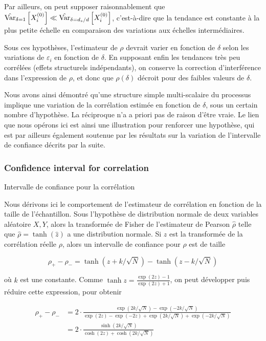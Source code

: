 Par ailleurs, on peut supposer raisonnablement que $\hat{\operatorname{Var}}_{\delta = 1}\left[X_i^{(0)}\right] \ll \hat{\operatorname{Var}}_{\delta = d_s / d}\left[X_i^{(0)}\right]$, c'est-à-dire que la tendance est constante à la plus petite échelle en comparaison des variations aux échelles intermédiaires.

Sous ces hypothèses, l'estimateur de $\rho$ devrait varier en fonction de $\delta$ selon les variations de $\varepsilon_i$ en fonction de $\delta$. En supposant enfin les tendances très peu corrélées (effets structurels indépendants), on conserve la correction d'interférence dans l'expression de $\rho$, et donc que $\rho(\delta)$ décroit pour des faibles valeurs de $\delta$.


Nous avons ainsi démontré qu'une structure simple multi-scalaire du processus implique une variation de la corrélation estimée en fonction de $\delta$, sous un certain nombre d'hypothèse. La réciproque n'a a priori pas de raison d'être vraie. Le lien que nous opérons ici est ainsi une illustration pour renforcer une hypothèse, qui est par ailleurs également soutenue par les résultats sur la variation de l'intervalle de confiance décrits par la suite.



\subsubsection{Confidence interval for correlation}{Intervalle de confiance pour la corrélation}

Nous dérivons ici le comportement de l'estimateur de corrélation en fonction de la taille de l'échantillon. Sous l'hypothèse de distribution normale de deux variables aléatoire $X,Y$, alors la transformée de Fisher de l'estimateur de Pearson $\hat{\rho}$ telle que $\hat{\rho} = \tanh (\hat{z})$ a une distribution normale. Si $z$ est la transformée de la corrélation réelle $\rho$, alors un intervalle de confiance pour $\rho$ est de taille

\[
\rho_{+} - \rho_{-} = \tanh (z + k / \sqrt{N}) - \tanh (z - k / \sqrt{N})
\]

où $k$ est une constante. Comme $\tanh{z} = \frac{\exp (2z) - 1}{\exp (2z) + 1}$, on peut développer puis réduire cette expression, pour obtenir

\[
\begin{split}
	\rho_{+} - \rho_{-} & = 2\cdot \frac{\exp (2k/\sqrt{N})-\exp (-2k/\sqrt{N})}{\exp (2z)-\exp (-2z) + \exp (2k/\sqrt{N}) + \exp (-2k/\sqrt{N})}\\
	& = 2\cdot \frac{\sinh{(2k/\sqrt{N})}}{\cosh{(2z)} + \cosh{(2k/\sqrt{N})}}
\end{split}
\]

